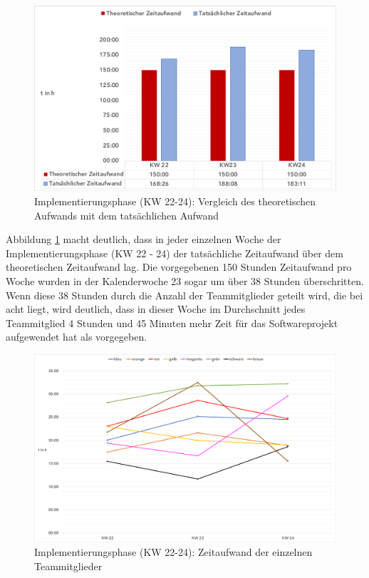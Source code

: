 \documentclass[../review_3.tex]{subfiles}
\begin{document}
\begin{figure} [h]
    \centering
    \includegraphics[width = \linewidth, trim=10pt 5pt 10pt 10pt, clip]{img/kimai7.pdf}
    \caption{Implementierungsphase (KW 22-24): Vergleich des theoretischen Aufwands mit dem tatsächlichen Aufwand}
    \label{kimai7}
\end{figure}
Abbildung \ref{kimai7} macht deutlich, dass in jeder einzelnen Woche der Implementierungsphase (KW 22 - 24) der tatsächliche Zeitaufwand über dem theoretischen Zeitaufwand lag. Die vorgegebenen 150 Stunden Zeitaufwand pro Woche wurden in der Kalenderwoche 23 sogar um über 38 Stunden überschritten. Wenn diese 38 Stunden durch die Anzahl der Teammitglieder geteilt wird, die bei acht liegt, wird deutlich, dass in dieser Woche im Durchschnitt jedes Teammitglied 4 Stunden und 45 Minuten mehr Zeit für das Softwareprojekt aufgewendet hat als vorgegeben.
\begin{figure} [h]
    \centering
    \includegraphics[width = \linewidth, trim=10pt 10pt 10pt 10pt, clip]{img/kimai9.pdf}
    \caption{Implementierungsphase (KW 22-24): Zeitaufwand der einzelnen Teammitglieder}
    \label{kimai9}
\end{figure}
\end{document}
